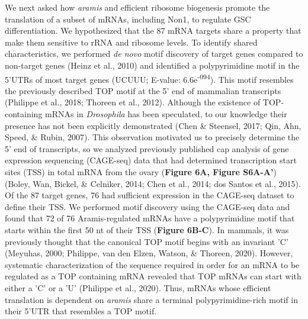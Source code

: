 \documentclass[12pt,twoside]{reedthesis}
\begin{document}
We next asked how \emph{aramis} and efficient ribosome biogenesis promote the
translation of a subset of mRNAs, including Non1, to regulate GSC
differentiation. We hypothesized that the 87 mRNA targets share a
property that make them sensitive to rRNA and ribosome levels. To
identify shared characteristics, we performed \emph{de novo} motif discovery
of target genes compared to non-target genes
(Heinz et al., 2010) and identified a
polypyrimidine motif in the 5'UTRs of most target genes (UCUUU; E-value:
6.6e\textsuperscript{-094}). This motif resembles the previously described TOP motif at
the 5' end of mammalian transcripts
(Philippe et al., 2018; Thoreen et al., 2012). Although the existence of
TOP-containing mRNAs in \emph{Drosophila} has been speculated, to our
knowledge their presence has not been explicitly demonstrated
(Chen \& Steensel, 2017; Qin, Ahn, Speed, \& Rubin, 2007). This observation motivated us to
precisely determine the 5' end of transcripts, so we analyzed previously
published {c}ap {a}nalysis of {g}ene
{e}xpression sequencing (CAGE-seq) data that had determined
transcription start sites (TSS) in total mRNA from the ovary (\textbf{Figure
6A, Figure S6A-A'}) (Boley, Wan, Bickel, \& Celniker, 2014; Chen et al., 2014; dos Santos et al., 2015). Of the 87 target genes,
76 had sufficient expression in the CAGE-seq dataset to define their
TSS. We performed motif discovery using the CAGE-seq data and found that
72 of 76 Aramis-regulated mRNAs have a polypyrimidine motif that starts
within the first 50 nt of their TSS (\textbf{Figure 6B-C}). In mammals, it
was previously thought that the canonical TOP motif begins with an
invariant 'C' (Meyuhas, 2000; Philippe, van den Elzen, Watson, \& Thoreen, 2020). However, systematic
characterization of the sequence required in order for an mRNA to be
regulated as a TOP containing mRNA revealed that TOP mRNAs can start
with either a 'C' or a 'U' (Philippe et al., 2020). Thus,
mRNAs whose efficient translation is dependent on \emph{aramis} share a
terminal polypyrimidine-rich motif in their 5'UTR that resembles a TOP
motif.
\end{document}
